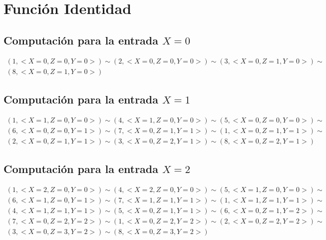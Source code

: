 \documentclass[a4paper]{article}
\begin{document}
		\section{Función Identidad}
		\subsection{Computación para la entrada $X=0$}
		\begin{equation*}\begin{gathered}
		(1, <X=0, Z=0, Y=0>) \sim (2, <X=0, Z=0, Y=0>) \sim (3, <X=0, Z=1, Y=0>) \sim\\
		(8, <X=0, Z=1, Y=0>)
		\end{gathered}\end{equation*}
		\subsection{Computación para la entrada $X=1$}
		\begin{equation*}\begin{gathered}
		(1, <X=1, Z=0, Y=0>) \sim (4, <X=1, Z=0, Y=0>) \sim (5, <X=0, Z=0, Y=0>) \sim\\
		(6, <X=0, Z=0, Y=1>) \sim (7, <X=0, Z=1, Y=1>) \sim (1, <X=0, Z=1, Y=1>) \sim\\
		(2, <X=0, Z=1, Y=1>) \sim (3, <X=0, Z=2, Y=1>) \sim (8, <X=0, Z=2, Y=1>)
		\end{gathered}\end{equation*}
		\subsection{Computación para la entrada $X=2$}
		\begin{equation*}\begin{gathered}
		(1, <X=2, Z=0, Y=0>) \sim (4, <X=2, Z=0, Y=0>) \sim (5, <X=1, Z=0, Y=0>) \sim\\
		(6, <X=1, Z=0, Y=1>) \sim (7, <X=1, Z=1, Y=1>) \sim (1, <X=1, Z=1, Y=1>) \sim\\
		(4, <X=1, Z=1, Y=1>) \sim (5, <X=0, Z=1, Y=1>) \sim (6, <X=0, Z=1, Y=2>) \sim\\
		(7, <X=0, Z=2, Y=2>) \sim (1, <X=0, Z=2, Y=2>) \sim (2, <X=0, Z=2, Y=2>) \sim\\
		(3, <X=0, Z=3, Y=2>) \sim (8, <X=0, Z=3, Y=2>)
		\end{gathered}\end{equation*}
\end{document}
